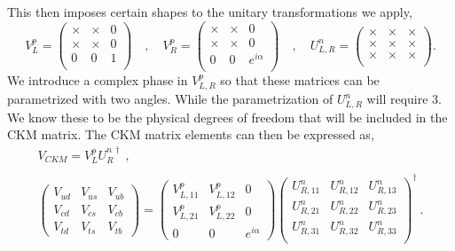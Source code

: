 \documentclass[10pt]{book}
\renewcommand{\(}{\left(}
\renewcommand{\)}{\right)}
\renewcommand{\[}{\left[}
\renewcommand{\]}{\right]}
\begin{document}
This then imposes certain shapes to the unitary transformations we apply,
\begin{equation}
V^{p}_{L} = \begin{pmatrix}
\times & \times & 0 \\ 
\times & \times & 0 \\
0 & 0 & 1 \\ 
\end{pmatrix} \quad , \quad   V^{p}_{R} = \begin{pmatrix}
\times & \times & 0 \\ 
\times & \times & 0 \\
0 & 0 & e^{i\alpha}  \\ 
\end{pmatrix}  \quad , \quad 
U^{n}_{L,R} = 
\begin{pmatrix}
\times & \times & \times \\ 
\times & \times & \times \\
\times & \times & \times \\
\end{pmatrix} .
\end{equation}
We introduce a complex phase in $V^p_{L,R}$ so that these matrices can be parametrized with two angles. While the parametrization of $U^n_{L,R}$ will require 3. We know these to be the physical degrees of freedom that will be included in the CKM matrix. The CKM matrix elements can then be expressed as, 
\begin{equation}
\begin{gathered}
V_{CKM} = V_L^p U_R^{n\, \dagger}  \ , \\ 
\\
\begin{pmatrix}
V_{ud} & V_{us} & V_{ub} \\
V_{cd} & V_{cs} & V_{cb} \\ 
V_{td} & V_{ts} & V_{tb} 
\end{pmatrix}  = \begin{pmatrix}
V_{L,11}^p & V_{L,12}^p & 0 \\ 
V_{L,21}^p & V_{L,22}^p & 0 \\ 
0 & 0 & e^{i \alpha} 
\end{pmatrix} \begin{pmatrix}
U_{R,11}^n & U_{R,12}^n & U_{R,13}^n \\
U_{R,21}^n & U_{R,22}^n & U_{R,23}^n \\
U_{R,31}^n & U_{R,32}^n & U_{R,33}^n \\
\end{pmatrix} ^\dagger \ .
\end{gathered} 
\end{equation}
\end{document}
